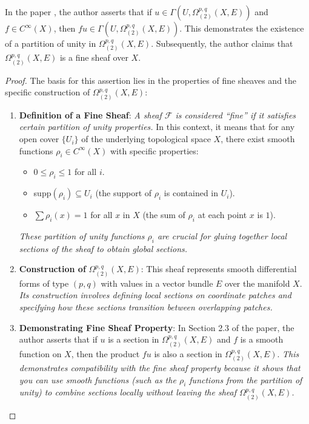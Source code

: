 \documentclass[twoside,openany,12pt]{beautynote}
\begin{document}
    \newcommand{\tmstrong}[1]{\textbf{#1}}
    \newcommand{\tmem}[1]{\emph{#1}}
    \begin{problem}\label{prob:fine sheaf}
        In the paper \cite[\S 2.3, P7]{huang2016logarithmic}, the author asserts that if $u
        \in \Gamma (U, \Omega^{p, q}_{(2)} (X, E))$ and $f \in C^{\infty} (X)$, then
        $fu \in \Gamma (U, \Omega^{p, q}_{(2)} (X, E))$. This demonstrates the
        existence of a partition of unity in $\Omega^{p, q}_{(2)} (X, E)$.
        Subsequently, the author claims that $\Omega^{p, q}_{(2)} (X, E)$ is a fine
        sheaf over $X$.
    \end{problem}
    
    \begin{proof}
        The basis for this assertion lies in the properties of fine sheaves and the
        specific construction of $\Omega^{p, q}_{(2)} (X, E)$:
        \begin{enumerate}
            \item  {\tmstrong{Definition of a Fine Sheaf}}: {\tmem{A sheaf $\mathcal{F}$ is
        considered ``fine'' if it satisfies certain partition of unity properties.}}
        In this context, it means that for any open cover $\{U_i \}$ of the
        underlying topological space $X$, there exist smooth functions $\rho_i \in
        C^{\infty} (X)$ with specific properties:
        \begin{itemize}
            \item $0 \leq \rho_i \leq 1$ for all $i$.
            \item supp$(\rho_i) \subseteq U_i$ (the support of $\rho_i$ is contained
            in $U_i$). 
            \item $\sum \rho_i (x) = 1$ for all $x$ in $X$ (the sum of $\rho_i$ at
            each point $x$ is $1$).
        \end{itemize}
        {\tmem{These partition of unity functions $\rho_i$ are crucial for gluing
        together local sections of the sheaf to obtain global sections.}}
        \item {\tmstrong{Construction of}} $\Omega^{p, q}_{(2)} (X, E)$: This sheaf
        represents smooth differential forms of type $(p, q)$ with values in a
        vector bundle $E$ over the manifold $X$. {\tmem{Its construction involves
        defining local sections on coordinate patches and specifying how these
        sections transition between overlapping patches.}}
        \item {\tmstrong{Demonstrating Fine Sheaf Property}}: In Section 2.3 of the
        paper, the author asserts that if $u$ is a section in $\Omega^{p, q}_{(2)}
        (X, E)$ and $f$ is a smooth function on $X$, then the product $fu$ is also a
        section in $\Omega^{p, q}_{(2)} (X, E)$. {\tmem{This demonstrates
        compatibility with the fine sheaf property because it shows that you can use
        smooth functions (such as the $\rho_i$ functions from the partition of
        unity) to combine sections locally without leaving the sheaf $\Omega^{p,
        q}_{(2)} (X, E)$.}}
        

\end{enumerate}
\end{proof}
\end{document}
